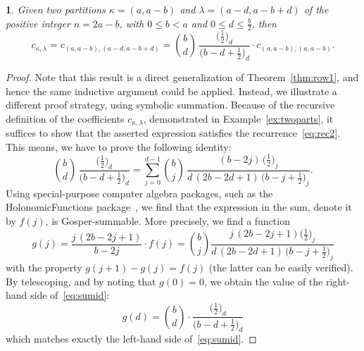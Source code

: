 \documentclass[10pt,oneside,american]{amsart}
\numberwithin{equation}{section}
\numberwithin{figure}{section}
\theoremstyle{plain}
\theoremstyle{definition}
\theoremstyle{remark}
\theoremstyle{plain}
\newtheorem{prop}[thm]{\protect\propositionname}
\theoremstyle{definition}
\theoremstyle{plain}
\theoremstyle{plain}
\providecommand{\propositionname}{Proposition}
\begin{document}
\begin{prop}\label{prop:p2row}
  Given two partitions $\kappa=(a,a-b)$ and $\lambda=(a-d,a-b+d)$ of the positive integer $n=2a-b$,
  with $0\leq b<a$ and $0\leq d\leq\frac{b}{2}$, then
  \begin{equation}\label{eq:2PartRec}
    c_{\kappa,\lambda} = c_{(a,a-b),(a-d,a-b+d)} =
    \binom{b}{d}\,\frac{\bigl(\frac12\bigr)_{\!d}}{\bigl(b-d+\frac12\bigr)_{\!d}} \cdot c_{(a,a-b),(a,a-b)}.
  \end{equation}
\end{prop}
\begin{proof}
  Note that this result is a direct generalization of Theorem~\ref{thm:row1},
  and hence the same inductive argument could be applied. Instead, we
  illustrate a different proof strategy, using symbolic summation. Because of
  the recursive definition of the coefficients $c_{\kappa,\lambda}$,
  demonstrated in Example~\ref{ex:twoparts}, it suffices to show that the
  asserted expression satisfies the recurrence~\eqref{eq:rec2}. This means, we
  have to prove the following identity:
  \begin{equation}\label{eq:sumid}
    \binom{b}{d}\,\frac{\bigl(\frac12\bigr)_{\!d}}{\bigl(b-d+\frac12\bigr)_{\!d}} =
    \sum_{j=0}^{d-1} \binom{b}{j}\,\frac{(b-2j)\,\bigl(\frac12\bigr)_{\!j}}{d\,(2b-2d+1)\,\bigl(b-j+\frac12\bigr)_{\!j}}.
  \end{equation}
  Using special-purpose computer algebra packages, such as the
  HolonomicFunctions package~\cite{HolonomicFunctions}, we find that the
  expression in the sum, denote it by $f(j)$, is Gosper-summable. More
  precisely, we find a function
  \[
    g(j) = \frac{j\,(2b-2j+1)}{b-2j} \cdot f(j) =
    \binom{b}{j}\frac{j\,(2b-2j+1) \bigl(\frac12\bigr)_{\!j}}{d\,(2b-2d+1)\,\bigl(b-j+\frac12\bigr)_{\!j}}
  \]
  with the property $g(j+1)-g(j)=f(j)$ (the latter can be easily
  verified). By telescoping, and by noting that $g(0)=0$, we obtain
  the value of the right-hand side of~\eqref{eq:sumid}:
  \[
    g(d) = \binom{b}{d}\cdot\frac{\bigl(\frac12\bigr)_{\!d}}{\bigl(b-d+\frac12\bigr)_{\!d}}
  \]
  which matches exactly the left-hand side of~\eqref{eq:sumid}.
\end{proof}
\end{document}
